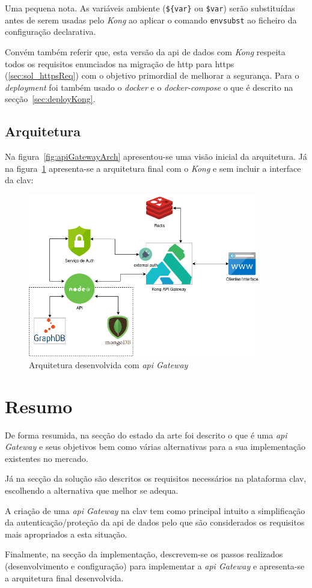 Uma pequena nota. As variáveis ambiente (\verb|${var}| ou \verb|$var|) serão substituídas antes de serem usadas pelo \textit{Kong} ao aplicar o comando \texttt{envsubst} ao ficheiro da configuração declarativa.

Convém também referir que, esta versão da \acrshort{api} de dados com \textit{Kong} respeita todos os requisitos enunciados na migração de \acrshort{http} para \acrshort{https} (\ref{sec:sol_httpsReq}) com o objetivo primordial de melhorar a segurança. Para o \textit{deployment} foi também usado o \textit{docker} e o \textit{docker-compose} o que é descrito na secção~\ref{sec:deployKong}.

\subsection{Arquitetura}
Na figura~\ref{fig:apiGatewayArch} apresentou-se uma visão inicial da arquitetura. Já na figura~\ref{fig:apiGatewayArchFinal} apresenta-se a arquitetura final com o \textit{Kong} e sem incluir a interface da \acrshort{clav}: 
\begin{figure}[H]
    \centering
    \includegraphics[width=0.9\textwidth]{img/apiGatewayArchFinal.png}
    \caption{Arquitetura desenvolvida com \textit{\acrshort{api} Gateway}}\label{fig:apiGatewayArchFinal}
\end{figure}

\section{Resumo}

De forma resumida, na secção do estado da arte foi descrito o que é uma \textit{\acrshort{api} Gateway} e seus objetivos bem como várias alternativas para a sua implementação existentes no mercado.

Já na secção da solução são descritos os requisitos necessários na plataforma \acrshort{clav}, escolhendo a alternativa que melhor se adequa.

A criação de uma \textit{\acrshort{api} Gateway} na \acrshort{clav} tem como principal intuito a simplificação da autenticação/proteção da \acrshort{api} de dados pelo que são considerados os requisitos mais apropriados a esta situação.

Finalmente, na secção da implementação, descrevem-se os passos realizados (desenvolvimento e configuração) para implementar a \textit{\acrshort{api} Gateway} e apresenta-se a arquitetura final desenvolvida.
